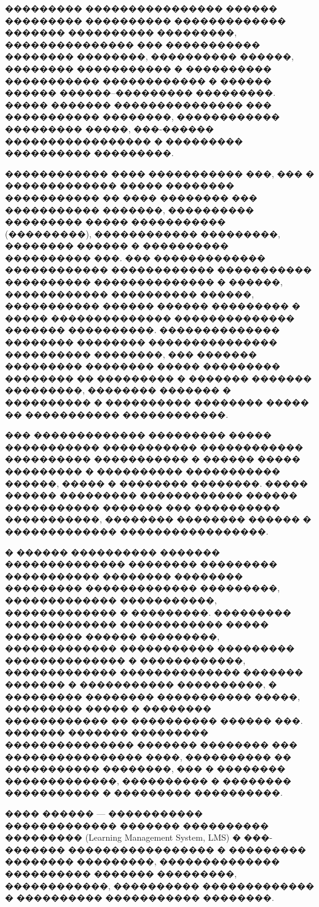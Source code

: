 \Introduction

��������� ���������������� ������ ��������� ���������� ������������� ������� ���������� ���������, ��������������� ��� ����������� �������� ��������, ���������� ������, �������� ����������� � ���������� ����������� ������������ � ������ ������ ������--��������� ���������. ����� ������� ��������������� ��� ����������� ��������, ������������ ��������� �����, ���-������ ����������������� � ��������� ���������� ���������.

������������ ���� ����������� ���, ��� � ������������� ����� �������� ����������� �� ���� �������� ��� ����������� �������, ���������� ��������� ����� ����������� (���������), ������������ ���������, �������� ������ � ���������� ���������� ���. ��� ������������� ������������ ������������ ����������� ���������� �������������� � ������, ������������ ���������� ������, ����������� ������ ������ ��������� � ����� �������������� �������������� ������� ����������. �������������� �������� �������� ��������������� ���������� ��������, ��� ������� ��������� �������� ����� ��������� �������� �� ��������� � ������� ������� ���������, �������� ������� � ���������� � ���������� �������� ����� �� ����������� ������������\cite{mobile_learning_solutions_2024,opigno_mobile_lms_2024}.

��� ������������� ��������� ����� ����������� ����������� ������������ ���������� ����������� � ������ ����� ��������� � ���������� ����������� ������, ����� � �������� ��������. ����� ������ ��������� ������������ ������ ����������� ������� ��� ���������� �����������, �������� �������� ������ � ������������� �����������������\cite{moodle_multitenancy_2024,yojji_multitenant_lms_2025}.

� ������ ���������� ������� �������������� �������� ��������� ����������� �������� �������� ��������� ������������� ���������, ������������� �����������, ������������� � ���������. ��������� ������������� ������������ ����� ��������� ������ ���������, ������������� ����������� ��������� �������������� � ������������, ������������� �������������� ������� ������� � ����������� ����������, � ��������� �������� ����������� �����, ��������� ����� � �������� ������������ �� ���������� ������ ���. ������� ������� ��������� ��������������� ������� �������� ��� ���������������� ����, ���������� �� ����������� ��������, ��� � �������� �������������, ���������� � �������� ����������� � ��������� ����������.

���� ������ --- ����������� ������������� ������� ���������� ��������� (Learning Management System, LMS) � ���-������� ����������������� � ��������� �������� ���������, �������������� ���������� ������� ���������, ������������, ���������� ������������� � ���������� ����������� ��������.

